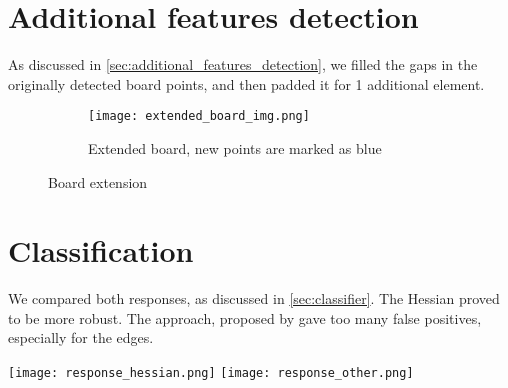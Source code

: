 \section{Additional features detection}\label{sec:additional_features_detection_exp}

As discussed in \cref{sec:additional_features_detection}, we filled the gaps in
the originally detected board points, and then padded it for 1 additional
element.

\begin{figure}[h]
	\centering
	\begin{minipage}{0.55\linewidth}
		\begin{subfigure}[b]{\linewidth}
			\texttt{[image: extended\_board\_img.png]}
			\label{fig:extended_board_img}
			\caption{Extended board, new points are marked as blue}
		\end{subfigure}
	\end{minipage}
	\begin{minipage}{0.35\linewidth}
		\vfill
	\end{minipage}
	\caption{Board extension}
\end{figure}

\section{Classification}\label{sec:classification}

\begin{minipage}[t]{0.3\linewidth}
	We compared both responses, as discussed in \cref{sec:classifier}.
	The Hessian proved to be more robust. The approach, proposed by
	\cite{geigerAutomaticCameraRange2012} gave too many false positives,
	especially for the edges.
\end{minipage}
\hfill
\begin{minipage}[t]{0.6\linewidth}
	\texttt{[image: response\_hessian.png]}
	\texttt{[image: response\_other.png]}
\end{minipage}

